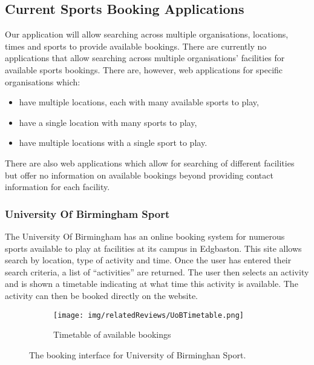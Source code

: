 \subsection{Current Sports Booking Applications}
\label{sub:current_sports_booking_applications}

Our application will allow searching across multiple organisations, locations,
times and sports to provide available bookings. There are currently no
applications that allow searching across multiple organisations' facilities for
available sports bookings. There are, however, web applications for specific
organisations which:
\begin{itemize}
	\item have multiple locations, each with many available sports to play,
	\item have a single location with many sports to play,
	\item have multiple locations with a single sport to play.
\end{itemize}
There are also web applications which allow for searching of different
facilities but offer no information on available bookings beyond providing
contact information for each facility.

\subsubsection{University Of Birmingham Sport}
\label{ssub:university_of_birmingham_sport}

The University Of Birmingham has an online booking system for numerous sports
available to play at facilities at its campus in Edgbaston\cite{UOBSport}. This
site allows search by location, type of activity and time. Once the user has
entered their search criteria, a list of ``activities'' are returned. The user
then selects an activity and is shown a timetable indicating at what time this
activity is available. The activity can then be booked directly on the website.
\begin{figure}[htbp]
	\centering
	\checkoddpage%
	\edef\side{\ifoddpage l\else r\fi}%
	\qquad
	\begin{subfigure}[b]{\textwidth}
		\texttt{[image: img/relatedReviews/UoBTimetable.png]}
		\caption{Timetable of available bookings}\label{fig:UoBTimetable}
	\end{subfigure}
	\caption{The booking interface for University of Birminghan Sport.
	}\label{fig:animals}
\end{figure}

